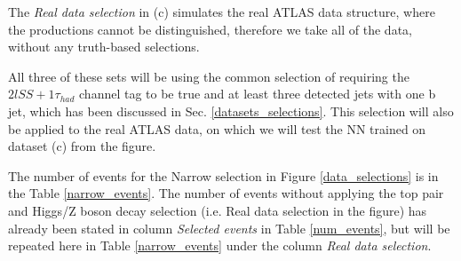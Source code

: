 \documentclass{ctuthesis}
\begin{document}
The \emph{Real data selection} in (c) simulates the real ATLAS data structure, where the productions cannot be distinguished, therefore we take all of the data, without any truth-based selections.

All three of these sets will be using the common selection of requiring the $2lSS + 1 \tau _{had}$ channel tag to be true and at least three detected jets with one b jet, which has been discussed in Sec. \ref{datasets_selections}. This selection will also be applied to the real ATLAS data, on which we will test the NN trained on dataset (c) from the figure.

\begin{figure}[h]
\end{figure}

The number of events for the Narrow selection in Figure \ref{data_selections} is in the Table \ref{narrow_events}. The number of events without applying the top pair and Higgs/Z boson decay selection (i.e. Real data selection in the figure) has already been stated in column \emph{Selected events} in Table \ref{num_events}, but will be repeated here in Table \ref{narrow_events} under the column \emph{Real data selection}.
\end{document}
